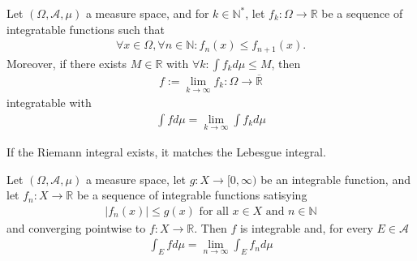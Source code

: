 \begin{theorem}
    Let \((\Omega, \mathcal{A}, \mu)\) a measure space, and for \(k \in \mathbb{N}^*\), let \(f_k: \Omega \rightarrow \mathbb{R}\) be a sequence of integratable functions such that
    \begin{align}
        \forall x \in \Omega, \forall n \in \mathbb{N}: f_n(x) \leq f_{n+1}(x) \text{.}
    \end{align}
    Moreover, if there exists \(M \in \mathbb{R}\) with \(\forall k: \int f_k d \mu \leq M\), then
    \begin{align}
        f := \lim_{k \rightarrow \infty} f_k: \Omega \rightarrow \overline{\mathbb{R}}
    \end{align}
    integratable with
    \begin{align}
        \int f d\mu = \lim_{k \rightarrow \infty} \int f_k d\mu
    \end{align}
\end{theorem}
\begin{theorem}
    If the Riemann integral exists, it matches the Lebesgue integral.
\end{theorem}
\begin{theorem}
    Let \((\Omega, \mathcal{A}, \mu)\) a measure space, let \(g: X \rightarrow [0, \infty)\) be an integrable function, and let \(f_n: X \rightarrow \mathbb{R}\) be a sequence of integrable functions satisying
    \begin{align}
        |f_n(x)| \leq g(x) \text{ for all } x \in X \text{ and } n \in \mathbb{N}
    \end{align}
    and converging pointwise to \(f: X \rightarrow \mathbb{R}\). Then \(f\) is integrable and, for every \(E \in \mathcal{A}\)
    \begin{align}
        \int_E f d\mu = \lim_{n \rightarrow \infty} \int_E f_n d\mu
    \end{align}
\end{theorem}